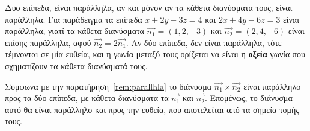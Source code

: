 \begin{rem}\label{rem:parallhla}
  Δυο επίπεδα, είναι \textcolor{Col1}{παράλληλα}, αν και μόνον αν τα κάθετα διανύσματα 
  τους, είναι παράλληλα. Για παράδειγμα τα επίπεδα $ x+2y-3z=4 $ και $ 2x+4y-6z=3 $ 
  είναι παράλληλα, γιατί τα κάθετα διανύσματα $ \vec{n_{1}} = (1,2,-3) $ και 
  $ \vec{n_{2}} = (2,4,-6) $ είναι επίσης παράλληλα, αφού 
  $ \vec{n_{2}} = 2 \vec{n_{1}} $. Αν δύο επίπεδα, δεν είναι παράλληλα, τότε τέμνονται 
  σε μία ευθεία, και η \textcolor{Col1}{γωνία} μεταξύ τους ορίζεται να είναι η 
  \textbf{οξεία} γωνία που σχηματίζουν τα κάθετα διανύσματά τους.
\end{rem}
\begin{rem}
  Σύμφωνα με την παρατήρηση~\ref{rem:parallhla} το διάνυσμα 
  $ \vec{n_{1}} \times \vec{n_{2}} $ είναι παράλληλο προς τα δύο επίπεδα, με κάθετα 
  διανύσματα τα $ \vec{n_{1}} $ και $ \vec{n_{2}} $. Επομένως, το διάνυσμα αυτό 
  θα είναι παράλληλο και προς την ευθεία, που αποτελείται από τα σημεία τομής τους.
\end{rem}

